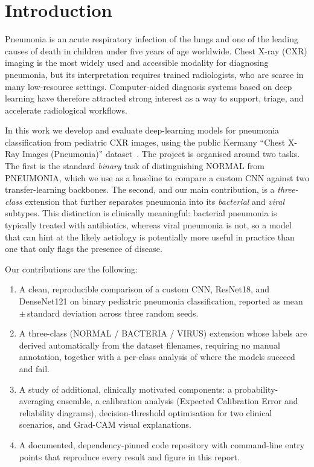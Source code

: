 \documentclass[runningheads]{llncs}
\begin{document}
\section{Introduction}

Pneumonia is an acute respiratory infection of the lungs and one of the
leading causes of death in children under five years of age worldwide.
Chest X-ray (CXR) imaging is the most widely used and accessible modality
for diagnosing pneumonia, but its interpretation requires trained
radiologists, who are scarce in many low-resource settings. Computer-aided
diagnosis systems based on deep learning have therefore attracted strong
interest as a way to support, triage, and accelerate radiological
workflows.

In this work we develop and evaluate deep-learning models for pneumonia
classification from pediatric CXR images, using the public
Kermany ``Chest X-Ray Images (Pneumonia)'' dataset~\cite{ref_kermany}.
The project is organised around two tasks. The first is the standard
\emph{binary} task of distinguishing NORMAL from PNEUMONIA, which we use
as a baseline to compare a custom CNN against two transfer-learning
backbones. The second, and our main contribution, is a \emph{three-class}
extension that further separates pneumonia into its \emph{bacterial} and
\emph{viral} subtypes. This distinction is clinically meaningful: bacterial
pneumonia is typically treated with antibiotics, whereas viral pneumonia is
not, so a model that can hint at the likely aetiology is potentially more
useful in practice than one that only flags the presence of disease.

Our contributions are the following:
\begin{enumerate}
  \item A clean, reproducible comparison of a custom CNN, ResNet18, and
  DenseNet121 on binary pediatric pneumonia classification, reported as
  mean\,$\pm$\,standard deviation across three random seeds.
  \item A three-class (NORMAL / BACTERIA / VIRUS) extension whose labels are
  derived automatically from the dataset filenames, requiring no manual
  annotation, together with a per-class analysis of where the models
  succeed and fail.
  \item A study of additional, clinically motivated components: a
  probability-averaging ensemble, a calibration analysis (Expected
  Calibration Error and reliability diagrams), decision-threshold
  optimisation for two clinical scenarios, and Grad-CAM visual
  explanations.
  \item A documented, dependency-pinned code repository with
  command-line entry points that reproduce every result and figure in
  this report.
\end{enumerate}
\end{document}
